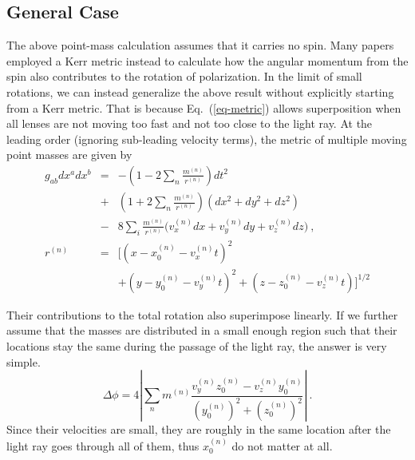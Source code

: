 \documentclass[aps,showpacs,twocolumn,floats,prd,superscriptaddress,nofootinbib]{revtex4}
\begin{document}
\subsection{General Case}

The above point-mass calculation assumes that it carries no spin. 
Many papers employed a Kerr metric instead to calculate how the angular momentum from the spin also contributes to the rotation of polarization. 
In the limit of small rotations, we can instead generalize the above result without explicitly starting from a Kerr metric. 
That is because Eq.~(\ref{eq-metric}) allows superposition when all lenses are not moving too fast and not too close to the light ray. 
At the leading order (ignoring sub-leading velocity terms), the metric of multiple moving point masses are given by
\begin{eqnarray}
g_{ab}dx^adx^b &=& -\left( 1 - 2\sum_n \frac{m^{(n)}}{r^{(n)}} \right)dt^2
 \\ \nonumber
&+& \left( 1 + 2\sum_n \frac{m^{(n)}}{r^{(n)}} \right) (dx^2+dy^2+dz^2) 
\\ \nonumber
&-& 8\sum_i \frac{m^{(n)} }{r^{(n)}}
\biggl(v^{(n)}_x dx  + v^{(n)}_y dy+ v^{(n)}_z dz\biggr)~, \\
r^{(n)} &=& \bigg[\left(x - x_0^{(n)} - v^{(n)}_x t\right)^2 
\\ \nonumber
& & + \left(y - y_0^{(n)} - v^{(n)}_y t\right)^2 
+ \left(z - z_0^{(n)} - v^{(n)}_z t\right) \bigg]^{1/2}
\end{eqnarray}

Their contributions to the total rotation also superimpose linearly. 
If we further assume that the masses are distributed in a small enough region such that their locations stay the same during the passage of the light ray, the answer is very simple. 
\begin{equation}
\Delta\phi = 4 \left| \sum_n m^{(n)} \frac{v_y^{(n)}z_0^{(n)} - v_z^{(n)}y_0^{(n)}}
{\left(y_0^{(n)}\right)^2+\left(z_0^{(n)}\right)^2} \right|~.
\label{eq-combine}
\end{equation}
Since their velocities are small, they are roughly in the same location after the light ray goes through all of them, thus $x_0^{(n)}$ do not matter at all. 
\end{document}
